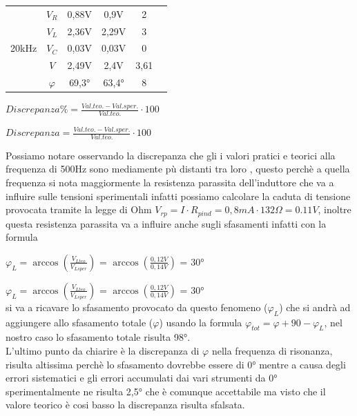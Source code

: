 \documentclass[12pt]{article}
\begin{document}
\begin{center}
\begin{table}[!h]
\begin{tabular}{|c|c|c|c|c|c|}
   
                            \multirow{5}{*}{20kHz} & \cellcolor{ngreen}$V_R$ &\cellcolor{ngreen} 0,88V&\cellcolor{ngreen} 0,9V&\cellcolor{ngreen}2 \\\cline{2-5}
      
                            & \cellcolor{ngreen}$V_L$ &\cellcolor{ngreen} 2,36V&\cellcolor{ngreen} 2,29V &\cellcolor{ngreen} 3\\\cline{2-5}
    
                            &\cellcolor{ngreen} $V_C$ &\cellcolor{ngreen}0,03V&\cellcolor{ngreen} 0,03V&\cellcolor{ngreen}0\\\cline{2-5}
    
                            &\cellcolor{ngreen} $V$   &\cellcolor{ngreen} 2,49V& \cellcolor{ngreen}2,4V&\cellcolor{ngreen} 3,61\\\cline{2-5}
    
                            & \cellcolor{ngreen}$\varphi$ &\cellcolor{ngreen}69,3° &\cellcolor{ngreen} 63,4°& \cellcolor{ngreen}8 \\\hline
                           

    \end{tabular}
\end{table}
$Discrepanza \%=\frac{Val. teo.-Val. sper.}{Val. teo.}\cdot 100$
\end{center}
\FloatBarrier 
$Discrepanza=\frac{Val. teo.-Val. sper.}{Val. teo.}\cdot 100$
\vspace{2mm}

Possiamo notare osservando la discrepanza che gli i valori pratici e teorici alla frequenza di 500Hz sono mediamente pù distanti tra loro 
, questo perchè a quella frequenza si nota maggiormente la resistenza parassita dell'induttore che va a influire sulle tensioni sperimentali infatti possiamo 
calcolare la caduta di tensione provocata tramite la legge di Ohm $V_{rp}=I\cdot R_{pind}=0,8mA \cdot 132 \Omega=0.11V$, inoltre questa resistenza parassita va a influire anche sugli sfasamenti
infatti con la formula\\ 
\begin{center}
$\varphi_L=\arccos(\frac{V_{Lteo}}{V_{Lsper}})$ = $\arccos(\frac{0,12V}{0,14V})$ = 30°\\
    
\end{center}
$\varphi_L=\arccos(\frac{V_{Lteo}}{V_{Lsper}})$ = $\arccos(\frac{0,12V}{0,14V})$ = 30°\\
si va a ricavare lo sfasamento provocato da questo fenomeno ($\varphi_L$) che si andrà ad aggiungere allo sfasamento totale ($\varphi$) usando la formula $\varphi_{tot}=\varphi+90-\varphi_L$, nel nostro caso lo sfasamento totale risulta 98°.\\
L'ultimo punto da chiarire è la discrepanza di $\varphi$ nella frequenza di risonanza, risulta altissima perchè lo sfasamento dovrebbe essere di 0° mentre 
a causa degli errori sistematici e gli errori accumulati dai vari strumenti da 0° sperimentalmente ne risulta 2,5° che è comunque accettabile ma visto che il valore teorico è cosi basso la discrepanza risulta sfalsata.\\
\end{document}
